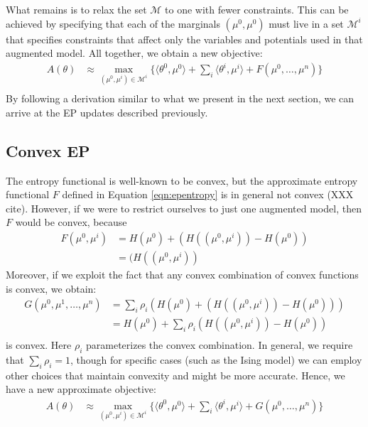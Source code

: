 \documentclass[times, 10pt,twocolumn]{article}
\begin{document}
What remains is to relax the set $\mathcal M$ to one with fewer
constraints. This can be achieved by specifying that each of the
marginals $(\mu^0,\mu^0)$ must live in a set $\mathcal M^i$ that
specifies constraints that affect only the variables and potentials
used in that augmented model. All together, we obtain a new
objective:
\begin{equation}
  \begin{split}
     A(\theta) 
     &\approx \max_{(\mu^0,\mu^i) \in \mathcal{M}^i} \{ \langle
     \theta^0, \mu^0 \rangle + \sum_i \langle\theta^i,\mu^i\rangle +F(\mu^0, \ldots, \mu^n) \} \\
   \end{split}
 \end{equation}
By following a derivation similar to what we present in the
next section, we can arrive at the EP updates described previously.

\subsection{Convex EP}

The entropy functional is well-known to be convex, but
the approximate entropy functional $F$ defined in Equation
\ref{eqn:epentropy} is in general not convex (XXX cite).
However, if we were to restrict ourselves to just one augmented
model, then $F$ would be convex, because
\begin{equation}
  \begin{split}
     F(\mu^0,\mu^i) &= H(\mu^0) + \left( H( (\mu^0, \mu^i)) -
     H(\mu^0) \right ) \\
     &= ( H( (\mu^0, \mu^i)) 
   \end{split}
 \end{equation}
Moreover, if we exploit the fact that any convex combination of
convex functions is convex, we obtain:
\begin{equation}
  \begin{split}
     G(\mu^0,\mu^1,\ldots,\mu^n) &= \sum_i \rho_i \left ( H(\mu^0) + \left( H( (\mu^0, \mu^i)) - H(\mu^0) \right ) \right ) \\
     &= H(\mu^0) + \sum_i \rho_i \left( H( (\mu^0, \mu^i)) - H(\mu^0) \right )  \\
   \end{split}
 \end{equation}
is convex. Here $\rho_i$ parameterizes the convex combination. In
general, we require that $\sum_i \rho_i = 1$, though for specific
cases (such as the Ising model) we can employ other choices that
maintain convexity and might be more accurate. Hence, we have a new
approximate objective:
\begin{equation}
  \begin{split}
     A(\theta) 
     &\approx \max_{(\mu^0,\mu^i) \in \mathcal{M}^i} \{
     \langle\theta^0,\mu^0\rangle + \sum_i \langle
     \theta^i,\mu^i\rangle  +G(\mu^0, \ldots, \mu^n) \} \\
   \end{split}
 \end{equation}
\end{document}
